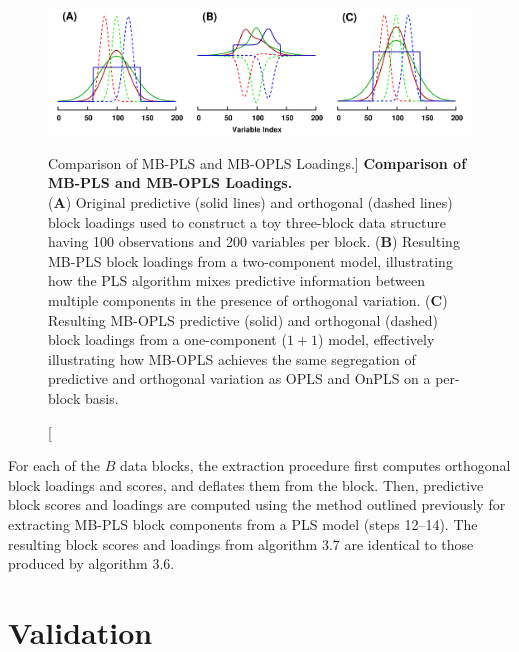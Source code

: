 \begin{figure}[ht!]
\includegraphics[width=6.5in]{figs/mva/14-mbopls.png}
\caption
      [Comparison of MB-PLS and MB-OPLS Loadings.]{
  {\bf Comparison of MB-PLS and MB-OPLS Loadings.}
  \\
  ({\bf A}) Original predictive (solid lines) and orthogonal (dashed lines)
  block loadings used to construct a toy three-block data structure having
  100 observations and 200 variables per block.
  ({\bf B}) Resulting MB-PLS block loadings from a two-component model,
  illustrating how the PLS algorithm mixes predictive information between
  multiple components in the presence of orthogonal variation.
  ({\bf C}) Resulting MB-OPLS predictive (solid) and orthogonal (dashed)
  block loadings from a one-component ($1+1$) model, effectively illustrating
  how MB-OPLS achieves the same segregation of predictive and orthogonal
  variation as OPLS and OnPLS on a per-block basis.
}
\end{figure}

\begin{doublespace}
For each of the $B$ data blocks, the extraction procedure first computes
orthogonal block loadings and scores, and deflates them from the block. Then,
predictive block scores and loadings are computed using the method outlined
previously \cite{westerhuis:jchemo1998} for extracting MB-PLS block components
from a PLS model (steps 12--14). The resulting block scores and loadings from
algorithm 3.7 are identical to those produced by algorithm 3.6.
\end{doublespace}

\section{Validation}

